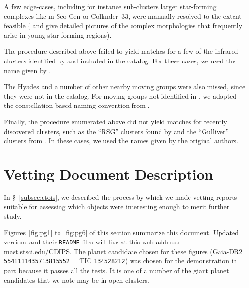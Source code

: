 \documentclass[12pt,twocolumn,tighten]{aastex62}
\begin{document}
A few edge-cases, including for instance sub-clusters  larger
star-forming complexes like in Sco-Cen or Collinder~33, were 
manually resolved to the extent feasible (\citealt{rizzuto_multidimensional_2011}
and \citealt{saurin_isolating_2015} give
detailed pictures of the complex morphologies that frequently arise in
young star-forming regions).

The procedure described above failed to yield matches for a few of the
infrared clusters identified by \citet{majaess_discovering_2013} and
included in the \citet{dias_proper_2014} catalog.
For these cases, we used the name given by \citet{dias_proper_2014}.

The Hyades and a number of other nearby moving groups were also
missed, since they were not in the \citet{Kharchenko_et_al_2013}
catalog.  For moving groups not identified in
\citet{Kharchenko_et_al_2013}, we adopted the constellation-based
naming convention from \citet{gagne_banyan_XI_2018}.  

Finally, the procedure enumerated above did not yield matches for
recently discovered clusters, such as the ``RSG'' clusters found by
\citet{roser_nine_RSG_2016} and the ``Gulliver'' clusters from
\citet{cantat-gaudin_gaia_2018}.  In these cases, we used the names
given by the original authors.

\section{Vetting Document Description}
\label{appendix:vetreport}

In \S~\ref{subsec:ctois}, we described the process by which we made 
vetting reports suitable for assessing which objects were interesting 
enough to merit further study.

Figures~\ref{fig:pg1} to~\ref{fig:pg6} of this
section summarize this document. Updated versions and their 
\texttt{README} files will live at this web-address: 
\url{mast.stsci.edu/CDIPS}.
The planet candidate chosen for these figures
(Gaia-DR2 \texttt{5541111035713815552} = TIC \texttt{134528212}) was
chosen for the demonstration in part because it passes all
the tests.
It is one of a number of the giant planet candidates that we note may
be in open clusters.
\end{document}
